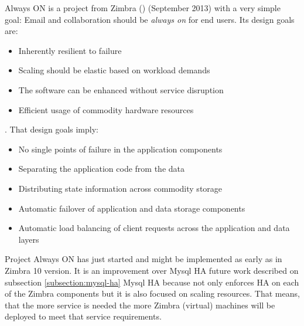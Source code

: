 Always ON is a project from Zimbra (\cite{ZimbraProjectAlwaysOn}) (September 2013) with a very simple goal: Email and collaboration should be \textit{always on} for end users. Its design goals are:
\begin{itemize}
  \item Inherently resilient to failure
  \item Scaling should be elastic based on workload demands
  \item The software can be enhanced without service disruption
  \item Efficient usage of commodity hardware resources
\end{itemize}
. That design goals imply:
\begin{itemize}
  \item No single points of failure in the application components
  \item Separating the application code from the data
  \item Distributing state information across commodity storage
  \item Automatic failover of application and data storage components
  \item Automatic load balancing of client requests across the application and data layers
\end{itemize}

Project Always ON has just started and might be implemented as early as in Zimbra 10 version. It is an improvement over Mysql HA future work described on subsection {\ref{subsection:mysql-ha} Mysql HA} because not only enforces HA on each of the Zimbra components but it is also focused on scaling resources. That means, that the more service is needed the more Zimbra (virtual) machines will be deployed to meet that service requirements.

